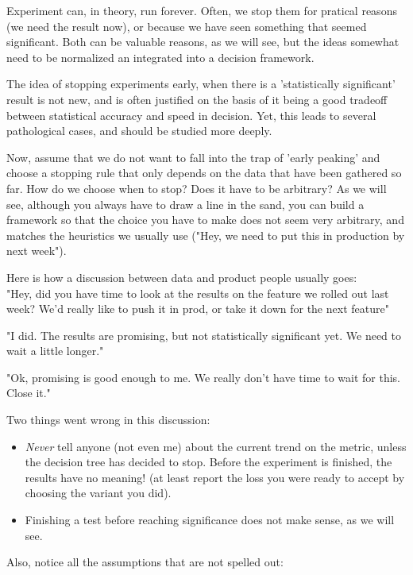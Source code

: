 \documentclass{tufte-book}
\begin{document}
Experiment can, in theory, run forever. Often, we stop them for pratical reasons (we need the result now), or
because we have seen something that seemed significant. Both can be valuable reasons, as we will see, but the
ideas somewhat need to be normalized an integrated into a decision framework.

The idea of stopping experiments early, when there is a 'statistically significant' result is not new, and is
often justified on the basis of it being a good tradeoff between statistical accuracy and speed in decision.
Yet, this leads to several pathological cases, and should be studied more deeply.

Now, assume that we do not want to fall into the trap of 'early peaking' and choose a stopping rule that only
depends on the data that have been gathered so far. How do we choose when to stop? Does it have to be
arbitrary? As we will see, although you always have to draw a line in the sand, you can build a framework so
that the choice you have to make does not seem very arbitrary, and matches the heuristics we usually use ("Hey,
we need to put this in production by next week").


Here is how a discussion between data and product people usually goes:\\

"Hey, did you have time to look at the results on the feature we rolled out last week? We'd really like to
push it in prod, or take it down for the next feature"

"I did. The results are promising, but not statistically significant yet. We need to wait a little longer."

"Ok, promising is good enough to me. We really don't have time to wait for this. Close it."

Two things went wrong in this discussion:

\begin{itemize}
  \item \textit{Never} tell anyone (not even me) about the current trend on the metric, unless the decision
    tree has decided to stop. Before the experiment is finished, the results have no meaning! (at least report
    the loss you were ready to accept by choosing the variant you did).
  \item Finishing a test before reaching significance does not make sense, as we will see.
\end{itemize}

Also, notice all the assumptions that are not spelled out:
\end{document}
